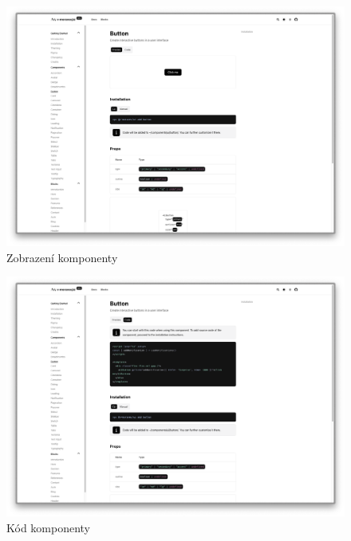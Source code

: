 \begin{figure}[h]
  \includegraphics[width=\textwidth]{images/component-preview}
  \caption{Zobrazení komponenty} \label{picture:documentation:component-preview}
\end{figure}

\begin{figure}[h]
  \includegraphics[width=\textwidth]{images/component-code}
  \caption{Kód komponenty} \label{picture:documentation:component-code}
\end{figure}

